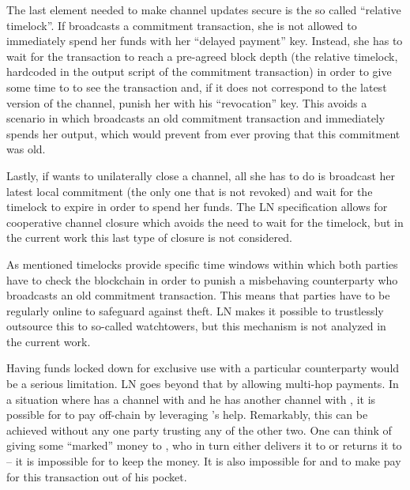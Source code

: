     The last element needed to make channel updates secure is the so called
    ``relative timelock''. If \alice{} broadcasts a commitment transaction, she
    is not allowed to immediately spend her funds with her ``delayed payment''
    key. Instead, she has to wait for the transaction to reach a pre-agreed
    block depth (the relative timelock, hardcoded in the output script of the
    commitment transaction) in order to give some time to \bob{} to see the
    transaction and, if it does not correspond to the latest version of the
    channel, punish her with his ``revocation'' key. This avoids a scenario in
    which \alice{} broadcasts an old commitment transaction and immediately
    spends her output, which would prevent \bob{} from ever proving that this
    commitment was old.

    Lastly, if \alice{} wants to unilaterally close a channel, all she has to do
    is broadcast her latest local commitment (the only one that is not revoked)
    and wait for the timelock to expire in order to spend her funds. The LN
    specification allows for cooperative channel closure which avoids the need
    to wait for the timelock, but in the current work this last type of closure
    is not considered.

    As mentioned timelocks provide specific time windows within which both
    parties have to check the blockchain in order to punish a misbehaving
    counterparty who  broadcasts an old commitment transaction. This means that
    parties have to be regularly online to safeguard against theft. LN makes it
    possible to trustlessly outsource this to so-called watchtowers, but this
    mechanism is not analyzed in the current work.

    Having funds locked down for exclusive use with a particular counterparty
    would be a serious limitation. LN goes beyond that by allowing multi-hop
    payments. In a situation where \alice{} has a channel with \bob{} and he has
    another channel with \charlie{}, it is possible for \alice{} to pay
    \charlie{} off-chain by leveraging \bob's help. Remarkably, this can be
    achieved without any one party trusting any of the other two. One can think
    of \alice{} giving some ``marked'' money to \bob{}, who in turn either
    delivers it to \charlie{} or returns it to \alice{} -- it is impossible for
    \bob{} to keep the money. It is also impossible for \alice{} and \charlie{}
    to make \bob{} pay for this transaction out of his pocket.

